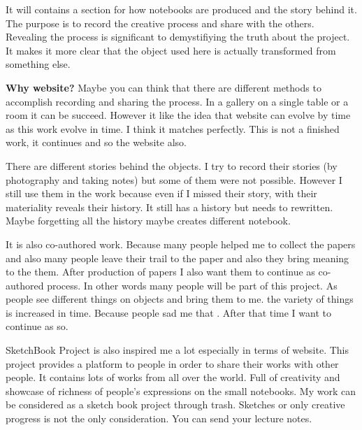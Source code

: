 {It will contains a section for how notebooks are produced and the story behind it. The purpose is to record the creative process and share with the others. Revealing the process is significant to demystifiying the truth about the project. It makes it more clear that the object used here is actually transformed from something else.

\textbf{Why website?} Maybe you can think that there are different methods to accomplish recording and sharing the process. In a gallery on a single table or a room it can be succeed. However it like the idea that website can evolve by time as this work evolve in time. I think it matches perfectly. This is not a finished work, it continues and so the website also.

There are different stories behind the objects. I try to record their stories (by photography and taking notes) but some of them were not possible. However I still use them in the work because even if I missed their story, with their materiality reveals their history. It still has a history but needs to rewritten. Maybe forgetting all the history maybe creates different notebook.

It is also co-authored work. Because many people helped me to collect the papers and also many people leave their trail to the paper and also they bring meaning to the them. After production of papers I also want them to continue as co-authored process. In other words many people will be part of this project. As people see different things on objects and bring them to me. the variety of things is increased in time. Because people sad me that . After that time I want to continue as so.

SketchBook Project is also inspired me a lot especially in terms of website. This project provides a platform to people in order to share their works with other people. It contains lots of works from all over the world. Full of creativity and showcase of richness of people's expressions on the small notebooks. My work can be considered as a sketch book project through trash. Sketches or only creative progress is not the only consideration. You can send your lecture notes.


}
